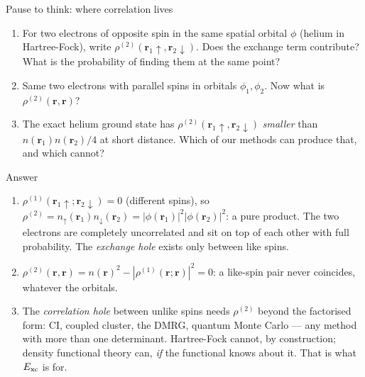 \documentclass[aspectratio=169,10pt]{beamer}
\newcounter{thinkctr}
\newcommand{\thinkq}[2]{%
  \stepcounter{thinkctr}%
  \vfill
  \begin{tcolorbox}[enhanced,colback=palewarm,colframe=warm,boxrule=1.2pt,arc=4pt,
    grow to left by=6mm,grow to right by=6mm,
    left=16pt,right=16pt,top=16pt,bottom=18pt,
    fonttitle=\bfseries\Large,fontupper=\Large,
    title={Pause to think \#\thethinkctr\hfill\mdseries\normalsize(about #1 min -- discuss with your neighbour)}]
  #2
  \end{tcolorbox}
  \vfill}
\newcommand{\thinka}[1]{%
  \vfill
  \begin{tcolorbox}[enhanced,colback=paleteal,colframe=teal,boxrule=1.2pt,arc=4pt,
    grow to left by=6mm,grow to right by=6mm,
    left=16pt,right=16pt,top=16pt,bottom=18pt,
    fonttitle=\bfseries\Large,fontupper=\large,
    title={Answer to pause \#\thethinkctr}]
  #1
  \end{tcolorbox}
  \vfill}
\begin{document}
\begin{frame}{Pause to think: where correlation lives}
  \thinkq{4}{
  \begin{enumerate}
    \item For two electrons of opposite spin in the same spatial orbital $\phi$ (helium in Hartree-Fock), write $\rho^{(2)}(\bm r_1\!\uparrow,\bm r_2\!\downarrow)$. Does the exchange term contribute? What is the probability of finding them at the same point?
    \item Same two electrons with parallel spins in orbitals $\phi_1,\phi_2$. Now what is $\rho^{(2)}(\bm r,\bm r)$?
    \item The exact helium ground state has $\rho^{(2)}(\bm r_1\!\uparrow,\bm r_2\!\downarrow)$ \emph{smaller} than $n(\bm r_1)n(\bm r_2)/4$ at short distance. Which of our methods can produce that, and which cannot?
  \end{enumerate}}
\end{frame}

\begin{frame}{Answer}
  \thinka{
  \begin{enumerate}
    \item $\rho^{(1)}(\bm r_1\!\uparrow;\bm r_2\!\downarrow)=0$ (different spins), so $\rho^{(2)}=n_\uparrow(\bm r_1)n_\downarrow(\bm r_2)=|\phi(\bm r_1)|^2|\phi(\bm r_2)|^2$: a pure product. The two electrons are completely uncorrelated and sit on top of each other with full probability. The \emph{exchange hole} exists only between like spins.
    \item $\rho^{(2)}(\bm r,\bm r)=n(\bm r)^2-|\rho^{(1)}(\bm r;\bm r)|^2=0$: a like-spin pair never coincides, whatever the orbitals.
    \item The \emph{correlation hole} between unlike spins needs $\rho^{(2)}$ beyond the factorised form: CI, coupled cluster, the DMRG, quantum Monte Carlo --- any method with more than one determinant. Hartree-Fock cannot, by construction; density functional theory can, \emph{if} the functional knows about it. That is what $E_{\rm xc}$ is for.
  \end{enumerate}}
\end{frame}
\end{document}

